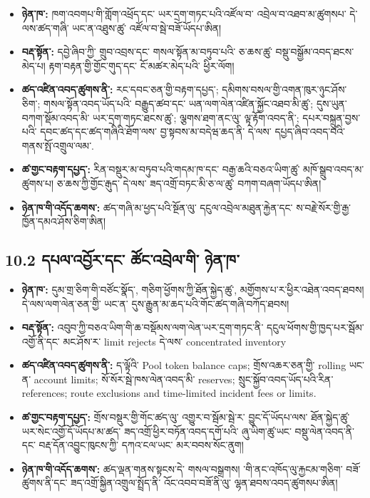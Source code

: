 \documentclass[11pt]{article}
\begin{document}
\begin{itemize}[leftmargin=*]
\item \textbf{ཉེན་ཁ་:} ཁག་འབགཔ་གི་གློག་འཕྲོད་དང་ ཡར་དྲག་གཏང་པའི་འཛོལ་བ་ འབྲེལ་བ་འཐབ་མ་ཚུགསཔ་ དེ་ལས་ཚད་གཞི་ ཡང་ན་འཐུས་ཚུ་ འཛོལ་བ་སྦེ་བཟོ་ཡོདཔ་ཨིན།
\item \textbf{བརྡ་སྟོན་:} དབྱེ་ཞིབ་ཀྱི་ གྲུབ་འབྲས་དང་ གསལ་སྟོན་མ་བཏུབ་པའི་ ཅ་ཆས་ཚུ་ བསྡུ་བསྒྱོམ་འབད་ཐངས་མེད་པ། རྟག་བརྟན་གྱི་གྱོང་གུད་དང་ ངོ་མཚར་མེད་པའི་ ཕྱིར་ལོག།
\item \textbf{ཚད་འཛིན་འབད་ཚུགས་ནི་:} རང་དབང་ཅན་གྱི་བརྟག་དཔྱད་; དམིགས་བསལ་གྱི་འགན་ཁུར་ཉུང་ཤོས་ཅིག་; གསལ་སྟོན་འབད་ཡོད་པའི་ བརྒྱུད་ཚབ་དང་ ཡན་ལག་ལེན་འཛིན་སྐྱོང་འཐབ་མི་ཚུ་; དུས་ཡུན་བཀག་སྡོམ་འབད་མི་ ཡར་དྲག་གཏང་ཐངས་ཚུ་; ལྕགས་ཐག་ནང་ལུ་ ལྟ་རྟོག་འབད་ནི་; དཔར་བསྐྲུན་བྱས་པའི་ དབང་ཚད་དང་ཚད་གཞིའི་ཐོག་ལས་ བྱ་སྟབས་མ་བདེཝ་ཆད་ནི་ དེ་ལས་ དཔྱད་ཞིབ་འབད་བའི་ གནས་སྤོ་འགྲུལ་ལམ་.
\item \textbf{ཚ་གྱང་བརྟག་དཔྱད་:} རིན་བསྡུར་མ་བཏུབ་པའི་གདམ་ཁ་དང་ བརྒྱ་ཆའི་བཅའ་ཡིག་ཚུ་ མཁོ་སྒྲུབ་འབད་མ་ཚུགས་པ། ཅ་ཆས་ཀྱི་གྱོང་རྒུད་ དེ་ལས་ ཟད་འགྲོ་བཏང་མི་ཅ་ལ་ཚུ་ བཀག་བཞག་ཡོདཔ་ཨིན།
\item \textbf{ཉེན་ཁ་གི་འདོད་ཆགས་:} ཚད་གཞི་མ་ཕྱད་པའི་སྔོན་ལུ་ དངུལ་འབྲེལ་མཐུན་རྐྱེན་དང་ ས་བརྗེ་སོར་གྱི་རྒྱ་ཁྱོན་དམའ་ཤོས་ཅིག་ཨིན།
\end{itemize}
\subsection*{10.2 དཔལ་འབྱོར་དང་ ཚོང་འབྲེལ་གི་ ཉེན་ཁ་}

\begin{itemize}[leftmargin=*]
\item \textbf{ཉེན་ཁ་:} དུམ་གྲ་ཅིག་གི་བཙོང་སྣོད་, གཅིག་ཕྱོགས་ཀྱི་ཐོན་སྐྱེད་ཚུ་, མགྱོགས་པ་ར་ཕྱིར་འཐེན་འབད་ཐབས། དེ་ལས་ལག་ལེན་ཅན་གྱི་ ཡང་ན་ དུས་རྒྱུན་མ་ཆད་པའི་གོང་ཚད་གཞི་བཀོད་ཐབས།
\item \textbf{བརྡ་སྟོན་:} འབུབ་ཀྱི་བཅའ་ཡིག་གི་ཆ་བསྡོམས་ལག་ལེན་ཡར་དྲག་གཏང་ནི་ དངུལ་ཕོགས་གྱི་ཁྱད་པར་སྦོམ་འགྱོ་ནི་དང་ མང་ཤོས་ར་ limit rejects དེ་ལས་ concentrated inventory
\item \textbf{ཚད་འཛིན་འབད་ཚུགས་ནི་:} ད་ལྟོའི་ Pool token balance caps; གྲོས་འཆར་ཅན་གྱི་ rolling ཡང་ན་ account limits; སོ་སོར་སྦེ་ཁས་ལེན་འབད་མི་ reserves; སྲུང་སྐྱོབ་འབད་ཡོད་པའི་རིན་ references; route exclusions and time-limited incident fees or limits.
\item \textbf{ཚ་གྱང་བརྟག་དཔྱད་:} གྲོས་བསྡུར་གྱི་གོང་ཚད་ལུ་ འགྱུར་བ་སྦོམ་སྦེ་ར་ བྱུང་དོ་ཡོདཔ་ལས་ ཐོན་སྐྱེད་ཚུ་ ཡར་སེང་འགྱོ་དོ་ཡོདཔ་མ་ཚད་ ཟད་འགྲོ་ཕྱིར་བཏོན་འབད་དགོ་པའི་ ཞུ་ཡིག་ཚུ་ཡང་ བསྡུ་ལེན་འབད་ནི་དང་ བརྡ་དོན་འབྱུང་ཁུངས་ཀྱི་ དཀའ་ངལ་ཡང་ མར་བབས་སོང་ནུག།
\item \textbf{ཉེན་ཁ་གི་འདོད་ཆགས་:} ཚད་ལྡན་གནས་སྟངས་དེ་ གསལ་བསྒྲགས། ་གི་ནང་འཁོད་ལུ་རྐྱངམ་གཅིག་ བཟོ་ཚུགས་ནི་དང་ ཟད་འགྲོ་སྐྱིན་འགྲུལ་སྤྲོད་ནི་ འོང་འབབ་བཟོ་ནི་ལུ་ ལྷན་ཐབས་འབད་ཚུགསཔ་ཨིན།
\end{itemize}
\end{document}
